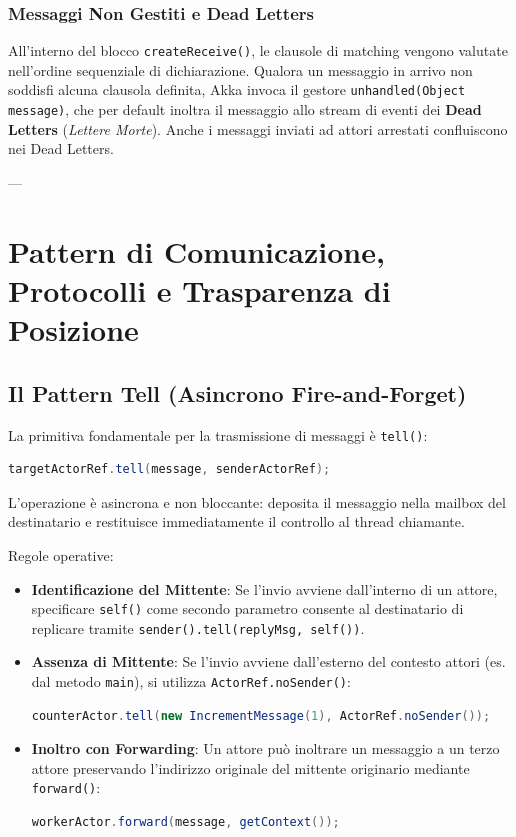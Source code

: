 \subsubsection{Messaggi Non Gestiti e Dead Letters}
All'interno del blocco \texttt{createReceive()}, le clausole di matching vengono valutate nell'ordine sequenziale di dichiarazione. Qualora un messaggio in arrivo non soddisfi alcuna clausola definita, Akka invoca il gestore \texttt{unhandled(Object message)}, che per default inoltra il messaggio allo stream di eventi dei \textbf{Dead Letters} (\textit{Lettere Morte}). Anche i messaggi inviati ad attori arrestati confluiscono nei Dead Letters.

---

\section{Pattern di Comunicazione, Protocolli e Trasparenza di Posizione}

\subsection{Il Pattern Tell (Asincrono Fire-and-Forget)}
La primitiva fondamentale per la trasmissione di messaggi è \texttt{tell()}:
\begin{lstlisting}[language=Java]
targetActorRef.tell(message, senderActorRef);
\end{lstlisting}
L'operazione è asincrona e non bloccante: deposita il messaggio nella mailbox del destinatario e restituisce immediatamente il controllo al thread chiamante.

Regole operative:
\begin{itemize}
    \item \textbf{Identificazione del Mittente}: Se l'invio avviene dall'interno di un attore, specificare \texttt{self()} come secondo parametro consente al destinatario di replicare tramite \texttt{sender().tell(replyMsg, self())}.
    \item \textbf{Assenza di Mittente}: Se l'invio avviene dall'esterno del contesto attori (es. dal metodo \texttt{main}), si utilizza \texttt{ActorRef.noSender()}:
    \begin{lstlisting}[language=Java]
counterActor.tell(new IncrementMessage(1), ActorRef.noSender());
    \end{lstlisting}
    \item \textbf{Inoltro con Forwarding}: Un attore può inoltrare un messaggio a un terzo attore preservando l'indirizzo originale del mittente originario mediante \texttt{forward()}:
    \begin{lstlisting}[language=Java]
workerActor.forward(message, getContext());
    \end{lstlisting}
\end{itemize}


